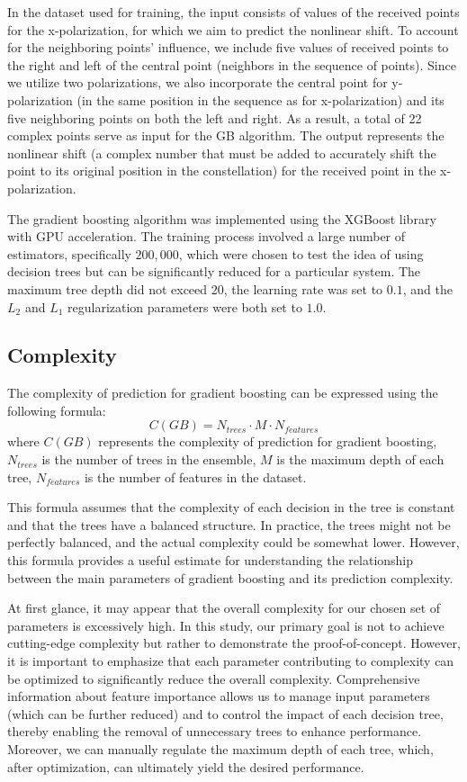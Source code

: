 In the dataset used for training, the input consists of values of the received points for the x-polarization, for which we aim to predict the nonlinear shift. To account for the neighboring points' influence, we include five values of received points to the right and left of the central point (neighbors in the sequence of points). Since we utilize two polarizations, we also incorporate the central point for y-polarization (in the same position in the sequence as for x-polarization) and its five neighboring points on both the left and right. As a result, a total of 22 complex points serve as input for the GB algorithm. The output represents the nonlinear shift (a complex number that must be added to accurately shift the point to its original position in the constellation) for the received point in the x-polarization.

The gradient boosting algorithm was implemented using the XGBoost library\cite{Chen:2016:XST:2939672.2939785} with GPU acceleration. The training process involved a large number of estimators, specifically $200,000$, which were chosen to test the idea of using decision trees but can be significantly reduced for a particular system. The maximum tree depth did not exceed $20$, the learning rate was set to $0.1$, and the $L_2$ and $L_1$ regularization parameters were both set to $1.0$.

\subsection{Complexity}
The complexity of prediction for gradient boosting can be expressed using the following formula:
$$
C(GB) = N_{trees} \cdot M \cdot N_{features}
$$
where $C(GB)$ represents the complexity of prediction for gradient boosting, $N_{trees}$ is the number of trees in the ensemble, $M$ is the maximum depth of each tree, $N_{features}$ is the number of features in the dataset.

This formula assumes that the complexity of each decision in the tree is constant and that the trees have a balanced structure. In practice, the trees might not be perfectly balanced, and the actual complexity could be somewhat lower. However, this formula provides a useful estimate for understanding the relationship between the main parameters of gradient boosting and its prediction complexity.

At first glance, it may appear that the overall complexity for our chosen set of parameters is excessively high. In this study, our primary goal is not to achieve cutting-edge complexity but rather to demonstrate the proof-of-concept. However, it is important to emphasize that each parameter contributing to complexity can be optimized to significantly reduce the overall complexity. Comprehensive information about feature importance allows us to manage input parameters (which can be further reduced) and to control the impact of each decision tree, thereby enabling the removal of unnecessary trees to enhance performance. Moreover, we can manually regulate the maximum depth of each tree, which, after optimization, can ultimately yield the desired performance.

